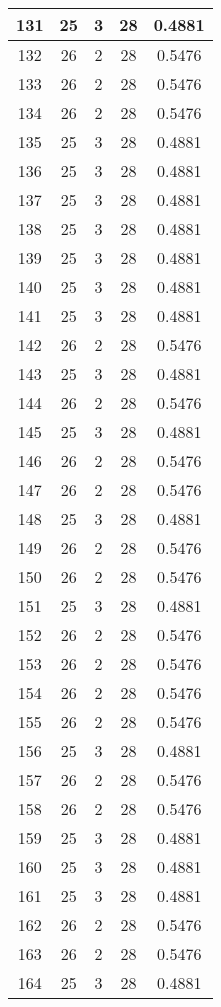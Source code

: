 \documentclass[letterpaper, 12pt]{article}
\begin{document}
\begin{longtable}{|c|c|c|c|c|}
\hline
131 & 25 & 3 & 28 & 0.4881 \\
\hline
132 & 26 & 2 & 28 & 0.5476 \\
\hline
133 & 26 & 2 & 28 & 0.5476 \\
\hline
134 & 26 & 2 & 28 & 0.5476 \\
\hline
135 & 25 & 3 & 28 & 0.4881 \\
\hline
136 & 25 & 3 & 28 & 0.4881 \\
\hline
137 & 25 & 3 & 28 & 0.4881 \\
\hline
138 & 25 & 3 & 28 & 0.4881 \\
\hline
139 & 25 & 3 & 28 & 0.4881 \\
\hline
140 & 25 & 3 & 28 & 0.4881 \\
\hline
141 & 25 & 3 & 28 & 0.4881 \\
\hline
142 & 26 & 2 & 28 & 0.5476 \\
\hline
143 & 25 & 3 & 28 & 0.4881 \\
\hline
144 & 26 & 2 & 28 & 0.5476 \\
\hline
145 & 25 & 3 & 28 & 0.4881 \\
\hline
146 & 26 & 2 & 28 & 0.5476 \\
\hline
147 & 26 & 2 & 28 & 0.5476 \\
\hline
148 & 25 & 3 & 28 & 0.4881 \\
\hline
149 & 26 & 2 & 28 & 0.5476 \\
\hline
150 & 26 & 2 & 28 & 0.5476 \\
\hline
151 & 25 & 3 & 28 & 0.4881 \\
\hline
152 & 26 & 2 & 28 & 0.5476 \\
\hline
153 & 26 & 2 & 28 & 0.5476 \\
\hline
154 & 26 & 2 & 28 & 0.5476 \\
\hline
155 & 26 & 2 & 28 & 0.5476 \\
\hline
156 & 25 & 3 & 28 & 0.4881 \\
\hline
157 & 26 & 2 & 28 & 0.5476 \\
\hline
158 & 26 & 2 & 28 & 0.5476 \\
\hline
159 & 25 & 3 & 28 & 0.4881 \\
\hline
160 & 25 & 3 & 28 & 0.4881 \\
\hline
161 & 25 & 3 & 28 & 0.4881 \\
\hline
162 & 26 & 2 & 28 & 0.5476 \\
\hline
163 & 26 & 2 & 28 & 0.5476 \\
\hline
164 & 25 & 3 & 28 & 0.4881 \\

\end{longtable}
\end{document}
